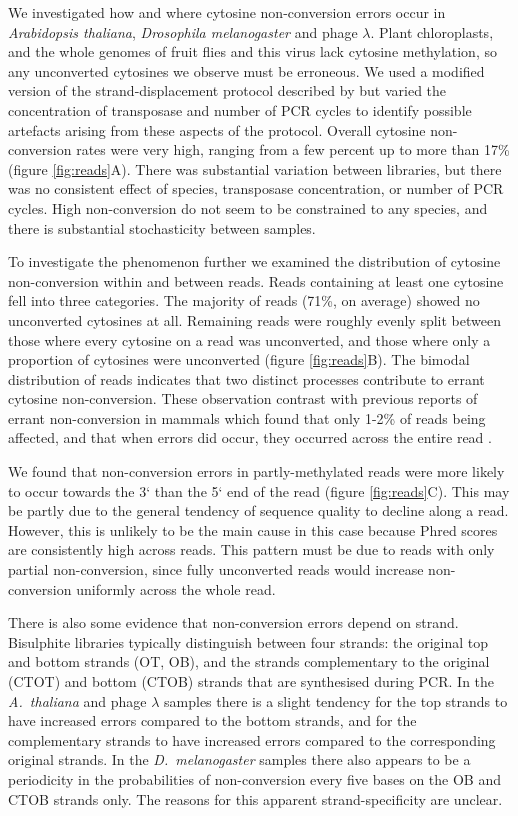 \documentclass[twocolumn,twoside,lettersize]{article}
\begin{document}
We investigated how and where cytosine non-conversion errors occur in \textit{Arabidopsis thaliana}, \textit{Drosophila melanogaster} and phage $\lambda$.
Plant chloroplasts, and the whole genomes of fruit flies and this virus lack cytosine methylation, so any unconverted cytosines we observe must be erroneous.
We used a modified version of the strand-displacement protocol described by \textcite{weichenhan2019generation} but varied the concentration of transposase and number of PCR cycles to identify possible artefacts arising from these aspects of the protocol.
Overall cytosine non-conversion rates were very high, ranging from a few percent up to more than 17\% (figure \ref{fig:reads}A).
There was substantial variation between libraries, but there was no consistent effect of species, transposase concentration, or number of PCR cycles.
High non-conversion do not seem to be constrained to any species, and there is substantial stochasticity between samples.

To investigate the phenomenon further we examined the distribution of cytosine non-conversion within and between reads.
Reads containing at least one cytosine fell into three categories.
The majority of reads (71\%, on average) showed no unconverted cytosines at all.
Remaining reads were roughly evenly split between those where every cytosine on a read was unconverted, and those where only a proportion of cytosines were unconverted (figure \ref{fig:reads}B).
The bimodal distribution of reads indicates that two distinct processes contribute to errant cytosine non-conversion.
These observation contrast with previous reports of errant non-conversion in mammals which found that only 1-2\% of reads being affected, and that when errors did occur, they occurred across the entire read \parencite{lu2015improved, suzuki2018whole}.

We found that non-conversion errors in partly-methylated reads were more likely to occur towards the 3` than the 5` end of the read (figure \ref{fig:reads}C).
This may be partly due to the general tendency of sequence quality to decline along a read.
However, this is unlikely to be the main cause in this case because Phred scores are consistently high across reads.
This pattern must be due to reads with only partial non-conversion, since fully unconverted reads would increase non-conversion uniformly across the whole read.

There is also some evidence that non-conversion errors depend on strand.
Bisulphite libraries typically distinguish between four strands: the original top and bottom strands (OT, OB), and the strands complementary to the original (CTOT) and bottom (CTOB) strands that are synthesised during PCR.
In the \emph{A.~thaliana} and phage $\lambda$ samples there is a slight tendency for the top strands to have increased errors compared to the bottom strands, and for the complementary strands to have increased errors compared to the corresponding original strands.
In the \emph{D.~melanogaster} samples there also appears to be a periodicity in the probabilities of non-conversion every five bases on the OB and CTOB strands only.
The reasons for this apparent strand-specificity are unclear.
\end{document}
